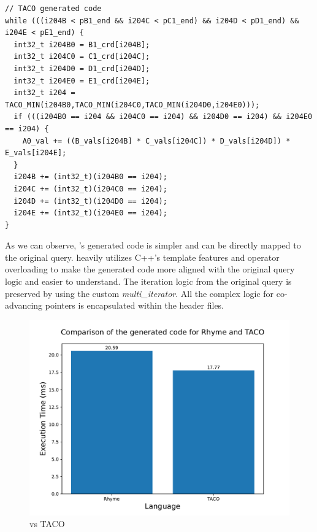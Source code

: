 \documentclass[acmsmall,nonacm]{acmart}\settopmatter{printfolios=true,printccs=false,printacmref=false}
\newcommand{\rhyme}{\text{Rhyme}\xspace}
\begin{document}
\vspace*{2mm}

\begin{lstlisting}[basicstyle=\ttfamily\footnotesize]
// TACO generated code
while (((i204B < pB1_end && i204C < pC1_end) && i204D < pD1_end) && i204E < pE1_end) {
  int32_t i204B0 = B1_crd[i204B];
  int32_t i204C0 = C1_crd[i204C];
  int32_t i204D0 = D1_crd[i204D];
  int32_t i204E0 = E1_crd[i204E];
  int32_t i204 = TACO_MIN(i204B0,TACO_MIN(i204C0,TACO_MIN(i204D0,i204E0)));
  if (((i204B0 == i204 && i204C0 == i204) && i204D0 == i204) && i204E0 == i204) {
    A0_val += ((B_vals[i204B] * C_vals[i204C]) * D_vals[i204D]) * E_vals[i204E];
  }
  i204B += (int32_t)(i204B0 == i204);
  i204C += (int32_t)(i204C0 == i204);
  i204D += (int32_t)(i204D0 == i204);
  i204E += (int32_t)(i204E0 == i204);
}
\end{lstlisting}
\vspace*{2mm}

As we can observe, \rhyme's generated code is simpler and can be directly mapped to the original query. \rhyme heavily utilizes C++'s template features and operator overloading to make the generated code more aligned with the original query logic and easier to understand. The iteration logic from the original query is preserved by using the custom \emph{multi\_iterator}. All the complex logic for co-advancing pointers is encapsulated within the header files.\par
\begin{figure}[H]
  \centering
      \includegraphics[scale=0.5]{figures/evaluation.pdf}
      \caption{\rhyme vs TACO}
      \label{evaluationpic}
  \end{figure}
\end{document}
